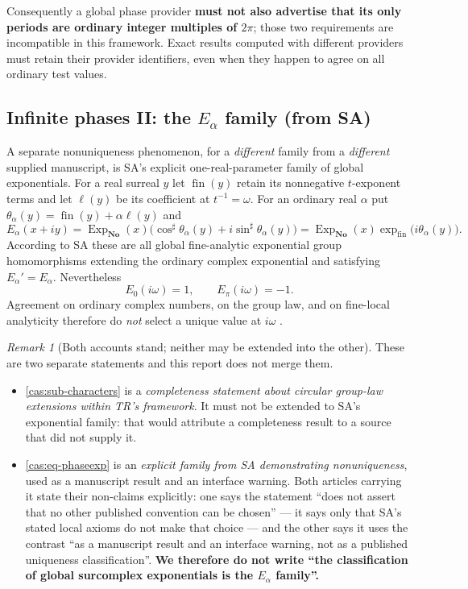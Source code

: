 \documentclass[11pt,letterpaper]{article}
\numberwithin{equation}{section}
\theoremstyle{definition}
\theoremstyle{remark}
\newtheorem{remark}[theorem]{Remark}
\newcommand{\No}{\mathbf{No}}
\newcommand{\fin}{\operatorname{fin}}
\newcommand{\ExpNo}{\operatorname{Exp}_{\No}}
\newcommand{\sh}{^{\sharp}}
\begin{document}
Consequently a global phase provider \textbf{must not also advertise that its
only periods are ordinary integer multiples of $2\pi$}; those two requirements
are incompatible in this framework. Exact results computed with different
providers must retain their provider identifiers, even when they happen to agree
on all ordinary test values.

\subsection{Infinite phases II: the \texorpdfstring{$E_\alpha$}{E-alpha} family (from SA)}
\label{cas:sub-infinitephases}
A separate nonuniqueness phenomenon, for a \emph{different} family from a
\emph{different} supplied manuscript, is SA's explicit one-real-parameter family
of global exponentials. For a real surreal $y$ let $\fin(y)$ retain its
nonnegative $t$-exponent terms and let $\ell(y)$ be its coefficient at
$t^{-1}=\omega$. For an ordinary real $\alpha$ put
$\theta_\alpha(y)=\fin(y)+\alpha\ell(y)$ and
\begin{equation}\label{cas:eq-phaseexp}
 E_\alpha(x+iy)=\ExpNo(x)\bigl(\cos\sh\theta_\alpha(y)
 +i\sin\sh\theta_\alpha(y)\bigr)
 =\ExpNo(x)\exp_{\mathrm{fin}}\bigl(i\theta_\alpha(y)\bigr).
\end{equation}
According to SA these are all global fine-analytic exponential group
homomorphisms extending the ordinary complex exponential and satisfying
$E_\alpha'=E_\alpha$. Nevertheless
\begin{equation}\label{cas:eq-phasecontrast}
 E_0(i\omega)=1,\qquad E_\pi(i\omega)=-1 .
\end{equation}
Agreement on ordinary complex numbers, on the group law, and on fine-local
analyticity therefore do \emph{not} select a unique value at $i\omega$
\cite{cas:SourceAnalysisTwo,cas:SourceAnalysisThree}.

\begin{remark}[Both accounts stand; neither may be extended into the other]
\label{cas:rem-phaseseparate}
These are two separate statements and this report does not merge them.
\begin{itemize}
\item \cref{cas:sub-characters} is a \emph{completeness statement about circular
group-law extensions within TR's framework}. It must not be extended to SA's
exponential family: that would attribute a completeness result to a source that
did not supply it.
\item \cref{cas:eq-phaseexp} is an \emph{explicit family from SA demonstrating
nonuniqueness}, used as a manuscript result and an interface warning. Both
articles carrying it state their non-claims explicitly: one says the statement
``does not assert that no other published convention can be chosen'' --- it says
only that SA's stated local axioms do not make that choice --- and the other
says it uses the contrast ``as a manuscript result and an interface warning, not
as a published uniqueness classification''. \textbf{We therefore do not write
``the classification of global surcomplex exponentials is the $E_\alpha$
family''.}
\end{itemize}
\end{remark}
\end{document}
